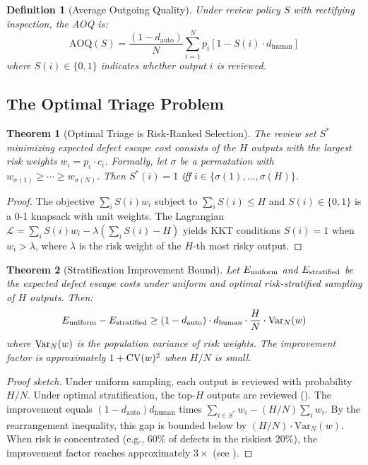 \documentclass[11pt, a4paper, copyright]{googledeepmind}
\newtheorem{definition}{Definition}[section]
\newtheorem{theorem}{Theorem}[section]
\begin{document}
\begin{definition}[Average Outgoing Quality]
\label{def:aoq}
Under review policy $S$ with rectifying inspection, the AOQ is:
\begin{equation}
\text{AOQ}(S) = \frac{(1 - d_{\text{auto}})}{N} \sum_{i=1}^{N} p_i \left[1 - S(i) \cdot d_{\text{human}}\right]
\end{equation}
where $S(i) \in \{0,1\}$ indicates whether output $i$ is reviewed.
\end{definition}

\subsection{The Optimal Triage Problem}

\begin{theorem}[Optimal Triage is Risk-Ranked Selection]
\label{thm:optimal-triage}
The review set $S^*$ minimizing expected defect escape cost consists of the $H$ outputs with the largest risk weights $w_i = p_i \cdot c_i$. Formally, let $\sigma$ be a permutation with $w_{\sigma(1)} \geq \cdots \geq w_{\sigma(N)}$. Then $S^*(i) = 1$ iff $i \in \{\sigma(1), \ldots, \sigma(H)\}$.
\end{theorem}

\begin{proof}
The objective $\sum_i S(i) w_i$ subject to $\sum_i S(i) \leq H$ and $S(i) \in \{0,1\}$ is a 0-1 knapsack with unit weights. The Lagrangian $\mathcal{L} = \sum_i S(i) w_i - \lambda(\sum_i S(i) - H)$ yields KKT conditions $S(i) = 1$ when $w_i > \lambda$, where $\lambda$ is the risk weight of the $H$-th most risky output.
\end{proof}

\begin{theorem}[Stratification Improvement Bound]
\label{thm:stratification}
Let $E_{\textup{uniform}}$ and $E_{\textup{stratified}}$ be the expected defect escape costs under uniform and optimal risk-stratified sampling of $H$ outputs. Then:
\begin{equation}
E_{\textup{uniform}} - E_{\textup{stratified}} \geq (1 - d_{\textup{auto}}) \cdot d_{\textup{human}} \cdot \frac{H}{N} \cdot \textup{Var}_N(w)
\end{equation}
where $\textup{Var}_N(w)$ is the population variance of risk weights. The improvement factor is approximately $1 + \textup{CV}(w)^2$ when $H/N$ is small.
\end{theorem}

\begin{proof}[Proof sketch]
Under uniform sampling, each output is reviewed with probability $H/N$. Under optimal stratification, the top-$H$ outputs are reviewed (). The improvement equals $(1 - d_{\text{auto}}) d_{\text{human}}$ times $\sum_{i \in S^*} w_i - (H/N)\sum_i w_i$. By the rearrangement inequality, this gap is bounded below by $(H/N) \cdot \text{Var}_N(w)$. When risk is concentrated (e.g., 60\% of defects in the riskiest 20\%), the improvement factor reaches approximately $3\times$ (see ).
\end{proof}
\end{document}
